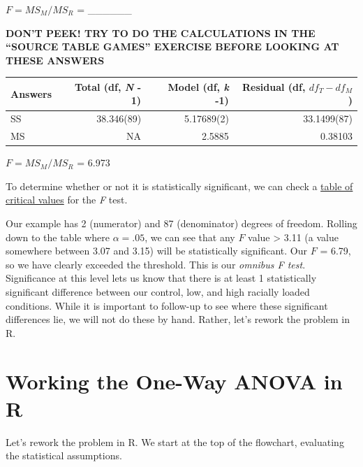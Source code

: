 \documentclass[
  english,
]{book}
\begin{document}
\(F = MS_{M}/MS_{R}\) = \_\_\_\_\_\_

\textbf{DON'T PEEK! TRY TO DO THE CALCULATIONS IN THE ``SOURCE TABLE GAMES'' EXERCISE BEFORE LOOKING AT THESE ANSWERS}

\begin{longtable}[]{@{}lrrr@{}}
\toprule
Answers & Total (df, \emph{N} - 1) & Model (df, \emph{k} -1) & Residual (df, \(df_T - df_M\)) \\
\midrule
\endhead
SS & 38.346(89) & 5.17689(2) & 33.1499(87) \\
MS & NA & 2.5885 & 0.38103 \\
\bottomrule
\end{longtable}

\(F = MS_{M}/MS_{R}\) = 6.973

To determine whether or not it is statistically significant, we can check a \href{https://www.statology.org/how-to-read-the-f-distribution-table/}{table of critical values} \citep{zach_how_2019} for the \emph{F} test.

Our example has 2 (numerator) and 87 (denominator) degrees of freedom. Rolling down to the table where \(\alpha = .05\), we can see that any \(F\) value \textgreater{} 3.11 (a value somewhere between 3.07 and 3.15) will be statistically significant. Our \(F\) = 6.79, so we have clearly exceeded the threshold. This is our \emph{omnibus F test}. Significance at this level lets us know that there is at least 1 statistically significant difference between our control, low, and high racially loaded conditions. While it is important to follow-up to see where these significant differences lie, we will not do these by hand. Rather, let's rework the problem in R.

\hypertarget{working-the-one-way-anova-in-r}{%
\section{Working the One-Way ANOVA in R}\label{working-the-one-way-anova-in-r}}

Let's rework the problem in R. We start at the top of the flowchart, evaluating the statistical assumptions.
\end{document}
